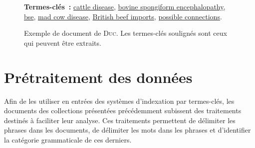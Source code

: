 \begin{figure}[!h]
{{          \textbf{Termes-clés~:} \underline{cattle disease}, \underline{bovine
          spongiform encephalopathy}, \underline{bse}, \underline{mad cow
          disease}, \underline{British beef imports}, \underline{possible
          connections}.
        }
      }
      \caption[Exemple de document de \textsc{Duc}]{
        Exemple de document de \textsc{Duc}. Les termes-clés soulignés sont ceux
        qui peuvent être extraits.
        \label{fig:example_duc}
      }
    \end{figure}
%
%
%          
%


  \section{Prétraitement des données}
  \label{sec:main-data_description-preprocessing}
    Afin de les utiliser en entrées des systèmes d'indexation par termes-clés,
    les documents des collections présentées précédemment subissent des
    traitements destinés à faciliter leur analyse. Ces traitements permettent de
    délimiter les phrases dans les documents, de délimiter les mots dans les
    phrases et d'identifier la catégorie grammaticale de ces derniers.

